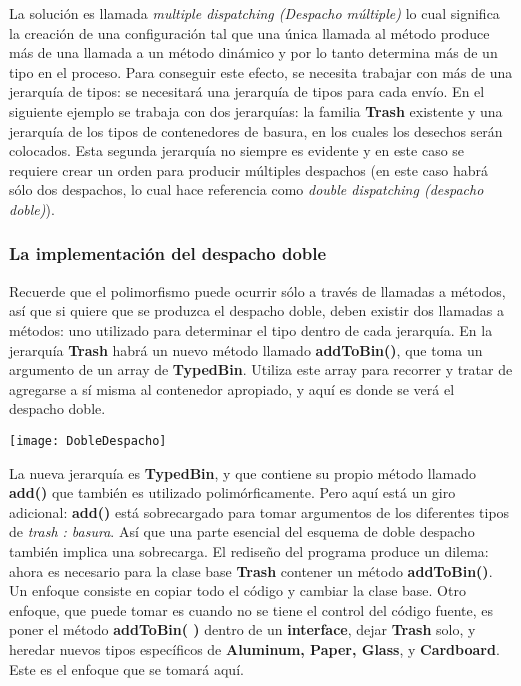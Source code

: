 La solución es llamada  \textit{multiple dispatching (Despacho múltiple)} lo cual significa la creación de una configuración tal que una única llamada al método produce más de una llamada a un método dinámico y por lo tanto determina más de un tipo en el proceso. Para conseguir este efecto, se necesita trabajar con más de una jerarquía de tipos: se necesitará una jerarquía de tipos para cada envío. En el siguiente ejemplo se trabaja con dos jerarquías: la familia \textbf{Trash} existente y una jerarquía de los tipos de contenedores de basura, en los cuales los desechos serán colocados. Esta segunda jerarquía no siempre es evidente y en este caso se requiere crear un orden para producir múltiples despachos (en este caso habrá sólo dos despachos, lo cual hace referencia como \textit{double dispatching (despacho doble)}).
\newpage


\subsubsection*{La implementación del despacho doble}
\label{subsubsec:liddd}


Recuerde que el polimorfismo puede ocurrir sólo a través de llamadas a métodos, así que si quiere que se produzca el despacho doble, deben existir dos llamadas a métodos: uno utilizado para determinar el tipo dentro de cada jerarquía. En la jerarquía \textbf{Trash} habrá un nuevo método llamado \textbf{addToBin()}, que toma un argumento de un array de \textbf{TypedBin}. Utiliza este array para recorrer y tratar de agregarse a sí misma al contenedor apropiado, y aquí es donde se verá el despacho doble. \newline

\texttt{[image: DobleDespacho]}

\vspace{0.5 cm}

La nueva jerarquía es \textbf{TypedBin}, y que contiene su propio método llamado \textbf{add()} que también es utilizado polimórficamente. Pero aquí está un giro adicional: \textbf{add()} está sobrecargado  para tomar argumentos de los diferentes tipos de \textit{trash : basura}. Así que una parte esencial del esquema de doble despacho también implica una sobrecarga. El rediseño del programa produce un dilema: ahora es necesario para la clase base \textbf{Trash} contener un método \textbf{addToBin()}. Un enfoque consiste en copiar todo el código y cambiar la clase base. Otro enfoque, que puede tomar es cuando no se tiene el control del código fuente, es poner el método \textbf{addToBin( )} dentro de un \textbf{interface}, dejar \textbf{Trash} solo, y heredar nuevos tipos específicos de \textbf{Aluminum, Paper, Glass}, y \textbf{Cardboard}. Este es el enfoque que se tomará aquí.    \newline

